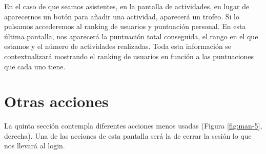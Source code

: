 En el caso de que seamos asistentes, en la pantalla de actividades, en lugar de aparecernos un botón para añadir una actividad, aparecerá un trofeo. Si lo pulsamos accederemos al ranking de usuarios y puntuación personal. En esta última pantalla, nos aparecerá la puntuación total conseguida, el rango en el que estamos y el número de actividades realizadas. Toda esta información se contextualizará mostrando el ranking de usuarios en función a las puntuaciones que cada uno tiene.

\section{Otras acciones}

La quinta sección contempla diferentes acciones menos usadas (Figura \ref{fig:man-5}, derecha). Una de las acciones de esta pantalla será la de cerrar la sesión lo que nos llevará al login.

